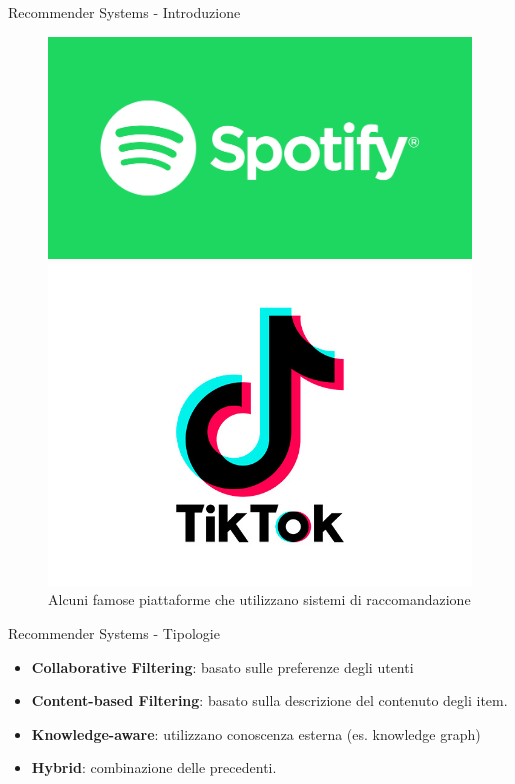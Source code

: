 \begin{frame}{Recommender Systems - Introduzione}
\begin{figure}[h!]
\begin{minipage}{0.15\textwidth}
    \end{minipage}\hfill
    \begin{minipage}{0.15\textwidth}
        \centering
        \includegraphics[width=\textwidth]{images/spotify.png}
    \end{minipage}\hfill
    \begin{minipage}{0.15\textwidth}
        \centering
        \includegraphics[width=\textwidth]{images/tiktok.png}
    \end{minipage}
    \caption{Alcuni famose piattaforme che utilizzano sistemi di raccomandazione}
\end{figure}
\end{frame}

\begin{frame}{Recommender Systems - Tipologie}
\begin{itemize}
    \item {} \textbf{Collaborative Filtering}: basato sulle preferenze degli utenti
    \item {} \textbf{Content-based Filtering}: basato sulla descrizione del contenuto degli item.
    \item {} \textbf{Knowledge-aware}: utilizzano conoscenza esterna (es. knowledge graph)
    \item {} \textbf{Hybrid}: combinazione delle precedenti.
\end{itemize}
\end{frame}

